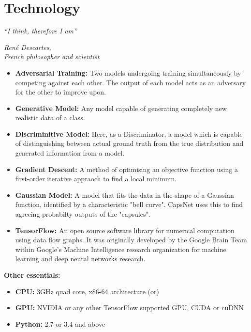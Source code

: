 \chapter{Technology}\label{ch:technology}
\epigraph{\textit{\Large “I think, therefore I am”}}{\textit{ \large René Descartes,\\ French philosopher and scientist}}
\begin{itemize}
	\item\textbf{Adversarial Training:} Two models undergoing training simultaneously by competing against each other. The output of each model acts as an adversary for the other to improve upon.
	\item\textbf{Generative Model:} Any model capable of generating completely new realistic data of a class.
	\item\textbf{Discriminitive Model:} Here, as a Discriminator, a model which is capable of distinguishing between actual ground truth from the true distribution and generated information from a model.
	\item\textbf{Gradient Descent:} A method of optimising an objective function using a first-order iterative appraoch to find a local minimum.
	\item\textbf{Gaussian Model:} A model that fits the data in the shape of a Gaussian function, identified by a characteristic "bell curve". CapsNet uses this to find agreeing probabilty outputs of the "capsules".
	\item\textbf{TensorFlow:} An open source software library for numerical computation using data flow graphs. It was originally developed by the Google Brain Team within Google's Machine Intelligence research organization for machine learning and deep neural networks research.

\end{itemize}

\textbf{\Large Other essentials:}

\begin{itemize}
	\item\textbf{CPU:} 3GHz quad core, x86-64 architecture (or)
	\item\textbf{GPU:} NVIDIA or any other TensorFlow supported GPU, CUDA or cuDNN
	\item\textbf{Python:} 2.7 or 3.4 and above
\end{itemize}
